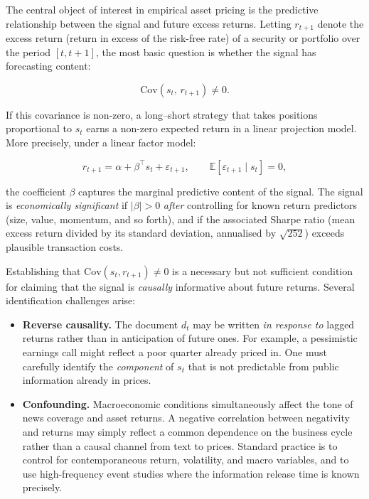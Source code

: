 \begin{context}
The central object of interest in empirical asset pricing is the predictive relationship
between the signal and future excess returns.  Letting $r_{t+1}$ denote the excess
return (return in excess of the risk-free rate) of a security or portfolio over the
period $[t, t+1]$, the most basic question is whether the signal has forecasting content:

\begin{equation}
\label{eq:signal-predictability}
  \mathrm{Cov}(s_t,\, r_{t+1}) \neq 0.
\end{equation}

If this covariance is non-zero, a long--short strategy that takes positions proportional
to $s_t$ earns a non-zero expected return in a linear projection model.  More precisely,
under a linear factor model:

\begin{equation}
\label{eq:linear-factor}
  r_{t+1} = \alpha + \beta^\top s_t + \varepsilon_{t+1}, \qquad
  \mathbb{E}[\varepsilon_{t+1} \mid s_t] = 0,
\end{equation}

the coefficient $\beta$ captures the marginal predictive content of the signal.  The
signal is \emph{economically significant} if $|\beta| > 0$ \emph{after} controlling for
known return predictors (size, value, momentum, and so forth), and if the associated
Sharpe ratio (mean excess return divided by its standard deviation, annualised by
$\sqrt{252}$) exceeds plausible transaction costs.

\begin{remark}
\label{rem:identification}
Establishing that $\mathrm{Cov}(s_t, r_{t+1}) \neq 0$ is a necessary but not sufficient
condition for claiming that the signal is \emph{causally} informative about future
returns.  Several identification challenges arise:

\begin{itemize}
  \item \textbf{Reverse causality.} The document $d_t$ may be written \emph{in response
    to} lagged returns rather than in anticipation of future ones.  For example, a
    pessimistic earnings call might reflect a poor quarter already priced in.  One must
    carefully identify the \emph{component} of $s_t$ that is not predictable from public
    information already in prices.

  \item \textbf{Confounding.} Macroeconomic conditions simultaneously affect the tone of
    news coverage and asset returns.  A negative correlation between negativity and
    returns may simply reflect a common dependence on the business cycle rather than a
    causal channel from text to prices.  Standard practice is to control for
    contemporaneous return, volatility, and macro variables, and to use high-frequency
    event studies where the information release time is known precisely.


\end{itemize}
\end{remark}
\end{context}
